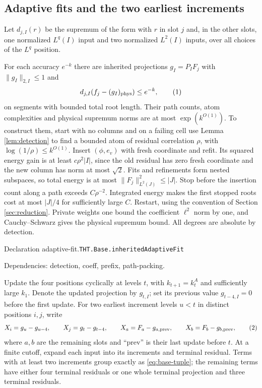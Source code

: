 \documentclass[11pt]{article}
\theoremstyle{definition}
\newcommand{\phys}{\mathrm{phys}}
\newcommand{\eqtag}[1]{\refstepcounter{equation}\tag{\theequation}\label{#1}}
\numberwithin{equation}{section}
\newcommand{\bp}[3]{\par\smallskip\begingroup\footnotesize
\noindent\hypertarget{bp:#1}{\textsf{Declaration #1.}}\quad\nolinkurl{#2}\par
\noindent\textsf{Dependencies:} #3.\par\endgroup\smallskip}
\begin{document}
\subsection{Adaptive fits and the two earliest increments}
Let $d_{j,I}(r)$ be the supremum of the form with $r$ in slot $j$ and, in the other slots, one normalized $L^q(I)$ input and two normalized $L^2(I)$ inputs, over all choices of the $L^q$ position.

For each accuracy $e^{-k}$ there are inherited projections $g_I=P_IF_j$ with $\|g_I\|_{2,I}\le1$ and
\[
 d_{j,I}(f_j-(g_I)_{\phys})\le e^{-k},
 \eqtag{eq:adaptive}
\]
on segments with bounded total root length. Their path counts, atom complexities and physical supremum norms are at most $\exp(k^{O(1)})$. To construct them, start with no columns and on a failing cell use Lemma \ref{lem:detection} to find a bounded atom of residual correlation $\rho$, with $\log(1/\rho)\le k^{O(1)}$. Insert $(\phi,e_v)$ with fresh coordinate and refit. Its squared energy gain is at least $c\rho^2|I|$, since the old residual has zero fresh coordinate and the new column has norm at most $\sqrt2$. Fits and refinements form nested subspaces, so total energy is at most $\|F_j\|_{L^2(J)}^2\le|J|$. Stop before the insertion count along a path exceeds $C\rho^{-2}$. Integrated energy makes the first stopped roots cost at most $|J|/4$ for sufficiently large $C$. Restart, using the convention of Section \ref{sec:reduction}. Private weights one bound the coefficient $\ell^2$ norm by one, and Cauchy--Schwarz gives the physical supremum bound. All degrees are absolute by detection.

\bp{adaptive-fit}{THT.Base.inheritedAdaptiveFit}{detection, coeff, prefix, path-packing}

Update the four positions cyclically at levels $t$, with $k_{t+1}=k_t^A$ and sufficiently large $k_1$. Denote the updated projection by $g_{t,I}$; set its previous value $g_{t-4,I}=0$ before the first update. For two earliest increment levels $u<t$ in distinct positions $i,j$, write
\[
 X_i=g_u-g_{u-4},\qquad X_j=g_t-g_{t-4},\qquad
 X_a=F_a-g_{a,\mathrm{prev}},\qquad X_b=F_b-g_{b,\mathrm{prev}},
 \eqtag{eq:base-tuple}
\]
where $a,b$ are the remaining slots and ``prev'' is their last update before $t$. At a finite cutoff, expand each input into its increments and terminal residual. Terms with at least two increments group exactly as \eqref{eq:base-tuple}; the remaining terms have either four terminal residuals or one whole terminal projection and three terminal residuals.
\end{document}
